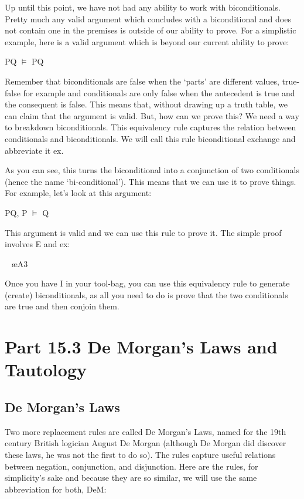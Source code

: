 Up until this point, we have not had any ability to work with biconditionals. Pretty much any valid argument which concludes with a biconditional and does not contain one in the premises is outside of our ability to prove. For a simplistic example, here is a valid argument which is beyond our current ability to prove: 
\begin{center}
P\eiff Q $\vDash$ P\eif Q
\end{center}
Remember that biconditionals are false when the `parts' are different values, true-false for example and conditionals are only false when the antecedent is true and the consequent is false. This means that, without drawing up a truth table, we can claim that the argument is valid. But, how can we prove this? We need a way to breakdown biconditionals. This equivalency rule captures the relation between conditionals and biconditionals. We will call this rule biconditional exchange and abbreviate it \eiff ex.

As you can see, this turns the biconditional into a conjunction of two conditionals (hence the name `bi-conditional'). This means that we can use it to prove things. For example, let's look at this argument:
\begin{center}
P\eiff Q, P $\vDash$ Q
\end{center}
This argument is valid and we can use this rule to prove it. The simple proof involves \eif E and \eiff ex:
\begin{fitchproof}
 	
\ae{A3}	
\end{fitchproof}

Once you have \eif I in your tool-bag, you can use this equivalency rule to generate (create) biconditionals, as all you need to do is prove that the two conditionals are true and then conjoin them.
\section{Part 15.3 De Morgan's Laws and Tautology}
\subsection{De Morgan's Laws}
Two more replacement rules are called De Morgan's Laws, named for the 19th century British logician August De Morgan (although De Morgan did discover these laws, he was not the first to do so). The rules capture useful relations between negation, conjunction, and disjunction. Here are the rules, for simplicity's sake and because they are so similar, we will use the same abbreviation for both, DeM:

